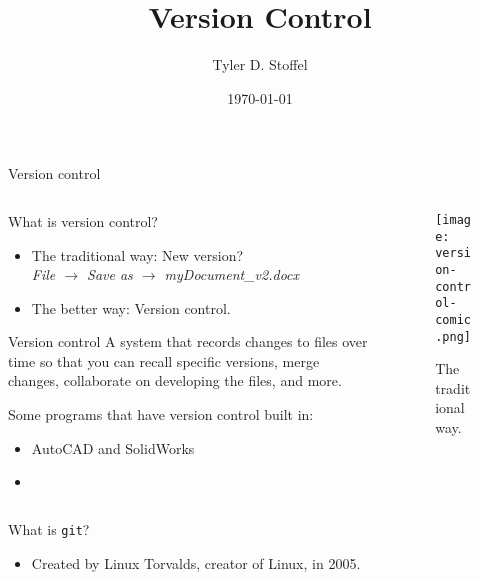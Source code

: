 \documentclass[9pt]{beamer}
\title{Version Control}
\date{\today}
\author{Tyler D. Stoffel}
\institute{ENT 419: Senior Project I}
\begin{document}
\maketitle
%
%
\begin{frame}{Version control}
  \begin{columns}
    \begin{column}{0.6\linewidth}
      What is version control?
      \begin{itemize}
        \item The traditional way: New version? \\ \emph{File $\rightarrow$ Save as $\rightarrow$ myDocument\_v2.docx}
        \item The better way: Version control.
      \end{itemize}
      \begin{alertblock}{Version control}
       A system that records changes to files over time so that you can recall specific versions, merge changes, collaborate on developing the files, and more.
      \end{alertblock}
      Some programs that have version control built in:
      \begin{itemize}
        \item AutoCAD and SolidWorks
        \item
      \end{itemize}
    \end{column}
    \begin{column}{0.4\linewidth}
      \begin{figure}
        \centering
        \texttt{[image: version-control-comic.png]}
        \caption{The traditional way.}
      \end{figure}
    \end{column}
  \end{columns}
\end{frame}
%
\begin{frame}{What is \texttt{git}?}
  \begin{itemize}
    \item Created by Linux Torvalds, creator of Linux, in 2005.
  \end{itemize}
\end{frame}
%
\end{document}
